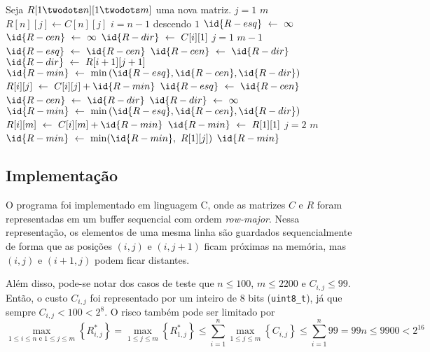 \begin{minipage}[t]{0.47\textwidth}
    \begin{codebox}
        \li Seja $R[1 \twodots n][1 \twodots m]$ uma nova matriz.
        \li
        \li {} $j = 1$  $m$
            \Do
        \li     $R[n][j] \gets C[n][j]$
            \End
        \li
        \li {} $i = n - 1$ descendo  $1$
            \Do
        \li     $\id{R-esq} \gets \infty$
        \li     $\id{R-cen} \gets \infty$
        \li     $\id{R-dir} \gets C[i][1]$
        \li
        \li     {} $j = 1$  $m - 1$
                \Do
        \li         $\id{R-esq} \gets \id{R-cen}$
        \li         $\id{R-cen} \gets \id{R-dir}$
        \li         $\id{R-dir} \gets R[i+1][j+1]$
        \li
        \li         $\id{R-min} \gets \min\left(\id{R-esq}, \id{R-cen}, \id{R-dir}\right)$
        \li         $R[i][j] \gets C[i][j] + \id{R-min}$
                \End
        \li
        \li     $\id{R-esq} \gets \id{R-cen}$
        \li     $\id{R-cen} \gets \id{R-dir}$
        \li     $\id{R-dir} \gets \infty$
        \li
        \li     $\id{R-min} \gets \min\left(\id{R-esq}, \id{R-cen}, \id{R-dir}\right)$
        \li     $R[i][m] \gets C[i][m] + \id{R-min}$
            \End
        \li
        \li $\id{R-min} \gets R[1][1]$
        \li {} $j = 2$  $m$
            \Do
        \li     $\id{R-min} \gets \min(\id{R-min},~R[1][j])$
            \End
        \li {} $\id{R-min}$
    \end{codebox}
\end{minipage}

\subsection{Implementação}

O programa foi implementado em linguagem C, onde as matrizes $C$ e $R$ foram representadas em um buffer sequencial com ordem \textit{row-major}. Nessa representação, os elementos de uma mesma linha são guardados sequencialmente de forma que as posições $(i, j)$ e $(i, j + 1)$ ficam próximas na memória, mas $(i, j)$ e $(i + 1, j)$ podem ficar distantes.

Além disso, pode-se notar dos casos de teste que $n \leq 100$, $m \leq 2200$ e $C_{i, j} \leq 99$. Então, o custo $C_{i, j}$ foi representado por um inteiro de 8 bits (\texttt{uint8\_t}), já que sempre $C_{i, j} < 100 < 2^8$. O risco também pode ser limitado por
\[
    \max_{1 \leq i \leq n \text{~e~} 1 \leq j \leq m} \left\{R^*_{i, j}\right\} = \max_{1 \leq j \leq m} \left\{R^*_{1, j}\right\} \leq \sum_{i = 1}^n \max_{1 \leq j \leq m}\left\{C_{i, j}\right\} \leq \sum_{i = 1}^n 99 = 99 n \leq 9900 < 2^{16}
\]

